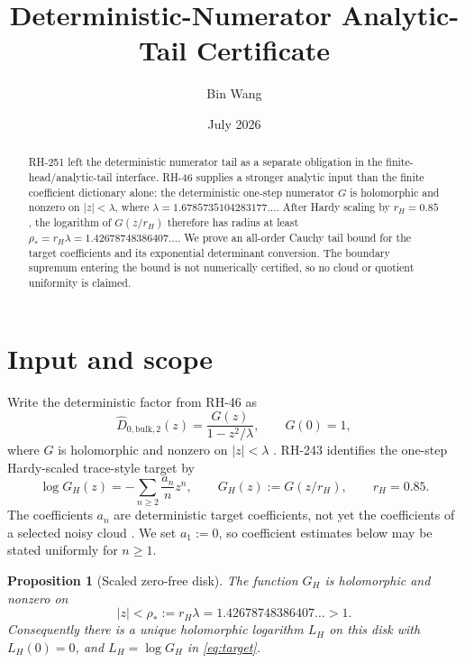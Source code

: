 \documentclass[11pt]{article}
\title{Deterministic-Numerator Analytic-Tail Certificate}
\author{Bin Wang}
\date{July 2026}
\newtheorem{proposition}[theorem]{Proposition}
\theoremstyle{definition}
\theoremstyle{remark}
\begin{document}
\maketitle

\begin{abstract}
RH-251 left the deterministic numerator tail as a separate obligation in the
finite-head/analytic-tail interface.  RH-46 supplies a stronger analytic input
than the finite coefficient dictionary alone: the deterministic one-step
numerator $G$ is holomorphic and nonzero on $|z|<\lambda$, where
$\lambda=1.6785735104283177\ldots$.  After Hardy scaling by $r_H=0.85$, the
logarithm of $G(z/r_H)$ therefore has radius at least
$\rho_*=r_H\lambda=1.42678748386407\ldots$.  We prove an all-order Cauchy
tail bound for the target coefficients and its exponential determinant
conversion.  The boundary supremum entering the bound is not numerically
certified, so no cloud or quotient uniformity is claimed.
\end{abstract}

\section{Input and scope}

Write the deterministic factor from RH-46 as
\begin{equation}
 \widehat D_{0,\mathrm{bulk},2}(z)=\frac{G(z)}{1-z^2/\lambda},
 \qquad G(0)=1,
 \label{eq:factor}
\end{equation}
where $G$ is holomorphic and nonzero on $|z|<\lambda$ \citep{WangRH46}.
RH-243 identifies the one-step Hardy-scaled trace-style target by
\begin{equation}
 \log G_H(z)=-\sum_{n\ge2}\frac{a_n}{n}z^n,
 \qquad G_H(z):=G(z/r_H),
 \qquad r_H=0.85.
 \label{eq:target}
\end{equation}
The coefficients $a_n$ are deterministic target coefficients, not yet the
coefficients of a selected noisy cloud \citep{WangRH243}.  We set $a_1:=0$,
so coefficient estimates below may be stated uniformly for $n\ge1$.

\begin{proposition}[Scaled zero-free disk]
\label{prop:radius}
The function $G_H$ is holomorphic and nonzero on
\begin{equation}
 |z|<\rho_*:=r_H\lambda=1.42678748386407\ldots>1.
 \label{eq:rho}
\end{equation}
Consequently there is a unique holomorphic logarithm $L_H$ on this disk with
$L_H(0)=0$, and $L_H=\log G_H$ in \eqref{eq:target}.
\end{proposition}
\end{document}
